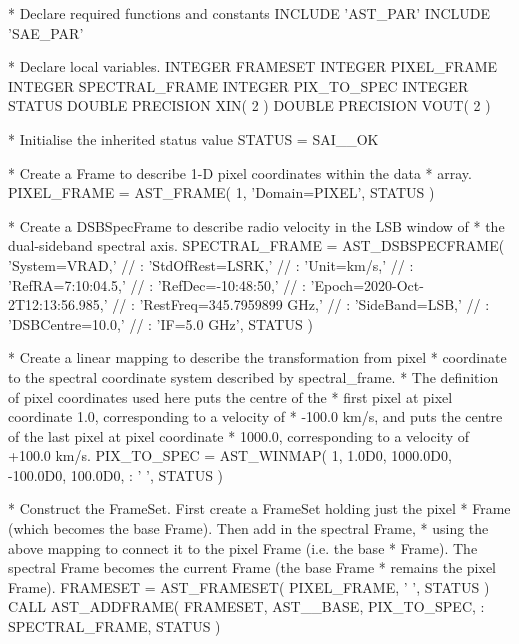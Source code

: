 \documentclass[twoside,11pt]{starlink}
\begin{document}
\begin{terminalv}

*  Declare required functions and constants
      INCLUDE 'AST_PAR'
      INCLUDE 'SAE_PAR'

*  Declare local variables.
      INTEGER FRAMESET
      INTEGER PIXEL_FRAME
      INTEGER SPECTRAL_FRAME
      INTEGER PIX_TO_SPEC
      INTEGER STATUS
      DOUBLE PRECISION XIN( 2 )
      DOUBLE PRECISION VOUT( 2 )

*  Initialise the inherited status value
      STATUS = SAI__OK

*  Create a Frame to describe 1-D pixel coordinates within the data
*  array.
      PIXEL_FRAME = AST_FRAME( 1, 'Domain=PIXEL', STATUS )

*  Create a DSBSpecFrame to describe radio velocity in the LSB window of
*  the dual-sideband spectral axis.
      SPECTRAL_FRAME = AST_DSBSPECFRAME( 'System=VRAD,' //
     :                               'StdOfRest=LSRK,' //
     :                               'Unit=km/s,' //
     :                               'RefRA=7:10:04.5,' //
     :                               'RefDec=-10:48:50,' //
     :                               'Epoch=2020-Oct-2T12:13:56.985,' //
     :                               'RestFreq=345.7959899 GHz,' //
     :                               'SideBand=LSB,' //
     :                               'DSBCentre=10.0,' //
     :                               'IF=5.0 GHz', STATUS )

*  Create a linear mapping to describe the transformation from pixel
*  coordinate to the spectral coordinate system described by spectral_frame.
*  The definition of pixel coordinates used here puts the centre of the
*  first pixel at pixel coordinate 1.0, corresponding to a velocity of
*  -100.0 km/s, and puts the centre of the last pixel at pixel coordinate
*  1000.0, corresponding to a velocity of +100.0 km/s.
      PIX_TO_SPEC = AST_WINMAP( 1, 1.0D0, 1000.0D0, -100.0D0, 100.0D0,
     :                          ' ', STATUS )

*  Construct the FrameSet. First create a FrameSet holding just the pixel
*  Frame (which becomes the base Frame). Then add in the spectral Frame,
*  using the above mapping to connect it to the pixel Frame (i.e. the base
*  Frame). The spectral Frame becomes the current Frame (the base Frame
*  remains the pixel Frame).
      FRAMESET = AST_FRAMESET( PIXEL_FRAME, ' ', STATUS )
      CALL AST_ADDFRAME( FRAMESET, AST__BASE, PIX_TO_SPEC,
     :                   SPECTRAL_FRAME, STATUS )


\end{terminalv}
\end{document}
